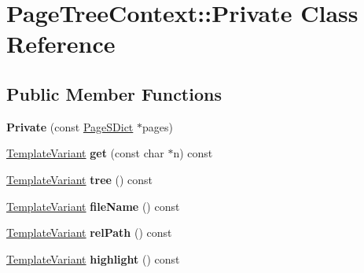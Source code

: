 \hypertarget{class_page_tree_context_1_1_private}{}\section{Page\+Tree\+Context\+::Private Class Reference}
\label{class_page_tree_context_1_1_private}
\subsection*{Public Member Functions}
\begin{DoxyCompactItemize}
\item 
\mbox{\label{class_page_tree_context_1_1_private_a1c45fb729d6bef294dc46cd3792bf3a0}} 
{\bfseries Private} (const \mbox{\hyperlink{class_page_s_dict}{Page\+S\+Dict}} $\ast$pages)
\item 
\mbox{\label{class_page_tree_context_1_1_private_a58bdf83a79d38a3870e2ac03db680335}} 
\mbox{\hyperlink{class_template_variant}{Template\+Variant}} {\bfseries get} (const char $\ast$n) const
\item 
\mbox{\label{class_page_tree_context_1_1_private_a8a497f8fc0c55fa933a775b6072c5191}} 
\mbox{\hyperlink{class_template_variant}{Template\+Variant}} {\bfseries tree} () const
\item 
\mbox{\label{class_page_tree_context_1_1_private_a8207d6d974d565d8bc8dea9d1ab8d376}} 
\mbox{\hyperlink{class_template_variant}{Template\+Variant}} {\bfseries file\+Name} () const
\item 
\mbox{\label{class_page_tree_context_1_1_private_a2e32db727fcbdd0221dd177f51c19561}} 
\mbox{\hyperlink{class_template_variant}{Template\+Variant}} {\bfseries rel\+Path} () const
\item 
\mbox{\label{class_page_tree_context_1_1_private_a39dcd836fc38f6cdcf6c5e07c2a95b5a}} 
\mbox{\hyperlink{class_template_variant}{Template\+Variant}} {\bfseries highlight} () const
\item 
\mbox{\label{class_page_tree_context_1_1_private_a4473875c3965cf5d3027883c82fb197b}} 

\end{DoxyCompactItemize}
